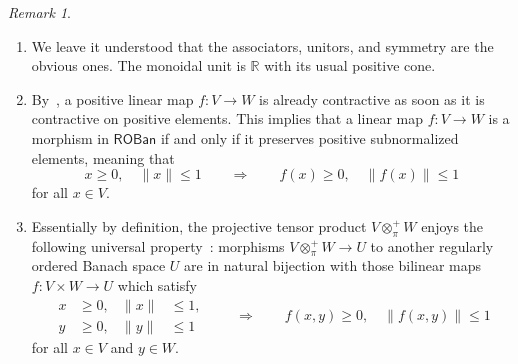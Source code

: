 \documentclass[11pt,onecolumn]{article}
\newcommand{\R}{\mathbb{R}}
\newcommand{\ROBan}{\mathsf{ROBan}}
\theoremstyle{plain}
\theoremstyle{remark}
\newtheorem{remark}[remark]{Remark}
\theoremstyle{definition}
\begin{document}
\begin{remark}
	\label{roban_misc}
	\begin{enumerate}
		\item We leave it understood that the associators, unitors, and symmetry are the obvious ones.
			The monoidal unit is $\R$ with its usual positive cone.
		\item\label{roban_morphisms} By~\cite[Proposition~1.1]{MinExponentialLaw}, a positive linear map $f \colon V \to W$ is already contractive as soon as it is contractive on positive elements.
			This implies that a linear map $f \colon V \to W$ is a morphism in $\ROBan$ if and only if it preserves positive subnormalized elements,
			meaning that
			\[
				x \ge 0, \quad \|x\| \le 1 \qquad \Longrightarrow \qquad f(x) \ge 0, \quad \|f(x)\| \le 1
			\]
			for all $x \in V$.
		\item\label{roban_universal_property}
			Essentially by definition, the projective tensor product $V \otimes_\pi^+ W$ enjoys the following universal property~\cite[Theorem~3.2]{MinExponentialLaw}:
			morphisms $V \otimes_\pi^+ W \to U$ to another regularly ordered Banach space $U$ are in natural bijection with those bilinear maps $f : V \times W \to U$
			which satisfy
			\begin{equation}
				\label{eq:roban_bilinear_morphism}
				\begin{aligned}
					x &\ge 0, & \|x\| &\le 1, \\
					y &\ge 0, & \|y\| &\le 1
				\end{aligned}
				\qquad \Longrightarrow \qquad f(x,y) \ge 0, \quad \|f(x,y)\| \le 1
			\end{equation}
			for all $x \in V$ and $y \in W$.
	\end{enumerate}
\end{remark}
\end{document}
